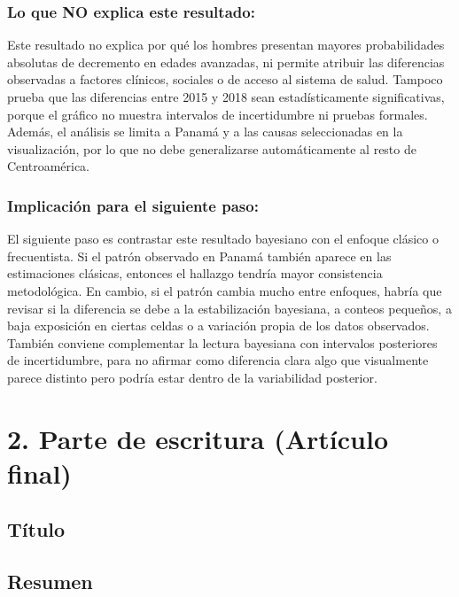 \documentclass[
  spanish,
  letterpaper,
  DIV=11,
  numbers=noendperiod]{scrartcl}
\begin{document}
\subsubsection{Lo que NO explica este
resultado:}\label{lo-que-no-explica-este-resultado-3}

Este resultado no explica por qué los hombres presentan mayores
probabilidades absolutas de decremento en edades avanzadas, ni permite
atribuir las diferencias observadas a factores clínicos, sociales o de
acceso al sistema de salud. Tampoco prueba que las diferencias entre
2015 y 2018 sean estadísticamente significativas, porque el gráfico no
muestra intervalos de incertidumbre ni pruebas formales. Además, el
análisis se limita a Panamá y a las causas seleccionadas en la
visualización, por lo que no debe generalizarse automáticamente al resto
de Centroamérica.

\subsubsection{Implicación para el siguiente
paso:}\label{implicaciuxf3n-para-el-siguiente-paso-3}

El siguiente paso es contrastar este resultado bayesiano con el enfoque
clásico o frecuentista. Si el patrón observado en Panamá también aparece
en las estimaciones clásicas, entonces el hallazgo tendría mayor
consistencia metodológica. En cambio, si el patrón cambia mucho entre
enfoques, habría que revisar si la diferencia se debe a la
estabilización bayesiana, a conteos pequeños, a baja exposición en
ciertas celdas o a variación propia de los datos observados. También
conviene complementar la lectura bayesiana con intervalos posteriores de
incertidumbre, para no afirmar como diferencia clara algo que
visualmente parece distinto pero podría estar dentro de la variabilidad
posterior.

\newpage

\section{2. Parte de escritura (Artículo
final)}\label{parte-de-escritura-artuxedculo-final}

\subsection{Título}\label{tuxedtulo}

\subsection{Resumen}\label{resumen}
\end{document}
